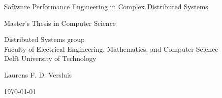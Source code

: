 \begin{titlepage}

  \begin{center}
  \null\vfill
    \begin{center}
    \LARGE{Software Performance Engineering in Complex Distributed Systems}
    \end{center}

    \vspace{3cm}

    \begin{large}
    Master's Thesis in Computer Science
    \end{large}

    \vspace{1.5cm}

    \begin{normalsize}
	Distributed Systems group\\
    Faculty of Electrical Engineering, Mathematics, and Computer Science\\
    Delft University of Technology
    \end{normalsize}

    \vspace{2.0cm}

    \begin{normalsize}
    Laurens F. D. Versluis
    \end{normalsize}

    \vspace{1.0cm}

    \today

  \vfill
  \end{center}

\end{titlepage}

